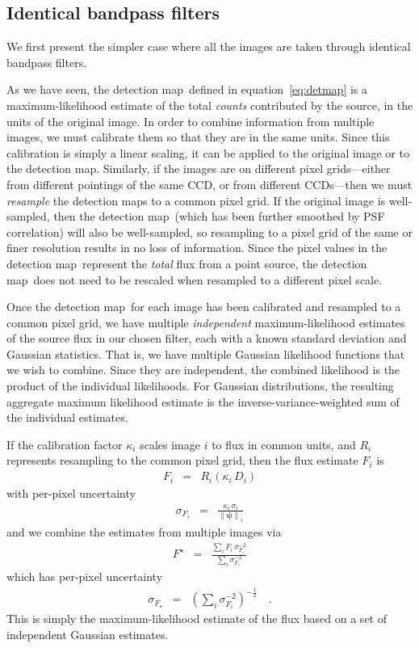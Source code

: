 \documentclass[11pt,letterpaper,linenumbers]{aastex63}
\newcommand{\equationname}{equation}
\newcommand{\eqnref}[1]{\mbox{\equationname~\ref{#1}}}
\newcommand{\detmap}{detection map}
\newcommand{\psf}{\psi}
\newcommand{\psfnorm}{\norm{\bm{\psf}}}
\newcommand{\norm}[1]{\left\lVert #1 \right\rVert}
\begin{document}
\subsection{Identical bandpass filters}

We first present the simpler case where all the images are taken
through identical bandpass filters.

As we have seen, the \detmap\ defined in \eqnref{eq:detmap} is a
maximum-likelihood estimate of the total \emph{counts} contributed by
the source, in the units of the original image.  In order to
combine information from multiple images, we must calibrate them so
that they are in the same units.  Since this calibration is simply a
linear scaling, it can be applied to the original image or to the
\detmap.  Similarly, if the images are on different pixel
grids---either from different pointings of the same CCD, or from
different CCDs---then we must \emph{resample} the \detmap s to a
common pixel grid.
%
If the original image is well-sampled, then the \detmap\ (which has
been further smoothed by PSF correlation) will also be well-sampled,
so resampling to a pixel grid of the same or finer resolution results
in no loss of information.
%
Since the pixel values in the \detmap\ represent the \emph{total} flux
from a point source, the \detmap\ does not need to be rescaled when
resampled to a different pixel scale.



Once the \detmap\ for each image has been calibrated and resampled to
a common pixel grid, we have multiple \emph{independent}
maximum-likelihood estimates of the source flux in our chosen filter,
each with a known standard deviation and Gaussian statistics.  That
is, we have multiple Gaussian likelihood functions that we wish to
combine.  Since they are independent, the combined likelihood is the
product of the individual likelihoods.  For Gaussian distributions,
the resulting aggregate maximum likelihood estimate is the
inverse-variance-weighted sum of the individual estimates.

If the calibration factor $\kappa_i$ scales image $i$ to flux in
common units, and $R_i$ represents resampling to the common pixel grid,
then the flux estimate $F_i$ is
\begin{eqnarray}
F_i &=& R_i(\kappa_i \, D_i)
\end{eqnarray}
with per-pixel uncertainty
\begin{eqnarray}
\sigma_{F_i} &=& \frac{\kappa_i \, \sigma_{i}}{\psfnorm_i}
\end{eqnarray}
and we combine the estimates from multiple images via
\begin{eqnarray}
F^{\star} &=& \frac{\displaystyle\sum_i F_i \, \sigma^{-2}_{F_i}}{\displaystyle\sum_i \sigma^{-2}_{F_i}}
\label{eq:onebandmap}
\end{eqnarray}
which has per-pixel uncertainty
\begin{eqnarray}
  \sigma_{F_{\star}} &=& \left( \sum_i \sigma^{-2}_{F_i} \right)^{-\frac{1}{2}}    \quad .
  \label{eq:onebandstd}
\end{eqnarray}
This is simply the maximum-likelihood estimate of the flux based on a
set of independent Gaussian estimates.
\end{document}
